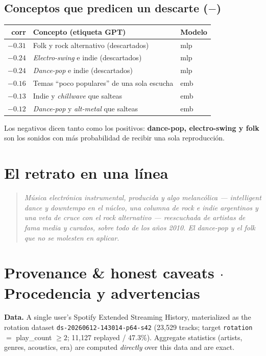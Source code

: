 \documentclass[11pt]{article}
\begin{document}
\subsection{Conceptos que predicen un descarte ($-$)}
\begin{center}
\begin{tabular}{@{}rll@{}}
\toprule
corr & Concepto (etiqueta GPT) & Modelo \\
\midrule
$-0.31$ & Folk y rock alternativo (descartados) & mlp \\
$-0.24$ & \emph{Electro-swing} e indie (descartados) & mlp \\
$-0.24$ & \emph{Dance-pop} e indie (descartados) & mlp \\
$-0.16$ & Temas ``poco populares'' de una sola escucha & emb \\
$-0.13$ & Indie y \emph{chillwave} que salteas & emb \\
$-0.12$ & \emph{Dance-pop} y \emph{alt-metal} que salteas & emb \\
\bottomrule
\end{tabular}
\end{center}

Los negativos dicen tanto como los positivos: \textbf{dance-pop, electro-swing y
folk} son los sonidos con más probabilidad de recibir una sola reproducción.

\section{El retrato en una línea}
\begin{quote}\itshape
Música electrónica instrumental, producida y algo melancólica --- \emph{intelligent
dance} y \emph{downtempo} en el núcleo, una columna de rock e indie argentinos y
una veta de cruce con el rock alternativo --- reescuchada de artistas de fama media
y curados, sobre todo de los años 2010. El \emph{dance-pop} y el folk que no se
molesten en aplicar.
\end{quote}

\clearpage
\section*{Provenance \& honest caveats \quad$\cdot$\quad Procedencia y advertencias}

\textbf{Data.} A single user's Spotify Extended Streaming History, materialized as
the rotation dataset \texttt{ds-20260612-143014-p64-s42} (23{,}529 tracks; target
\texttt{rotation} $=$ play\_count $\geq 2$; 11{,}127 replayed / 47.3\%). Aggregate
statistics (artists, genres, acoustics, era) are computed \emph{directly} over
this data and are exact.
\end{document}
